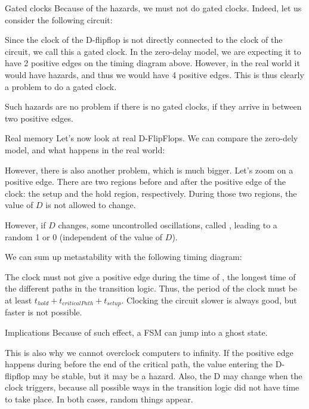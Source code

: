 \documentclass[a4paper]{article}
\begin{document}
\begin{parag}{Gated clocks}
    Because of the hazards, we must not do gated clocks. Indeed, let us consider the following circuit:

    Since the clock of the D-flipflop is not directly connected to the clock of the circuit, we call this a gated clock. In the zero-delay model, we are expecting it to have 2 positive edges on the timing diagram above. However, in the real world it would have hazards, and thus we would have 4 positive edges. This is thus clearly a problem to do a gated clock.

    Such hazards are no problem if there is no gated clocks, if they arrive in between two positive edges.
\end{parag}

\begin{parag}{Real memory}
    Let's now look at real D-FlipFlops. We can compare the zero-dely model, and what happens in the real world:

    However, there is also another problem, which is much bigger. Let's zoom on a positive edge. There are two regions before and after the positive edge of the clock: the setup and the hold region, respectively. During those two regions, the value of $D$ is not allowed to change.

    However, if $D$ changes, some uncontrolled oscillations, called , leading to a random 1 or 0 (independent of the value of $D$).

    We can sum up metastability with the following timing diagram:

    The clock must not give a positive edge during the time of , the longest time of the different paths in the transition logic. Thus, the period of the clock must be at least $t_{hold} + t_{criticalPath} + t_{setup}$. Clocking the circuit slower is always good, but faster is not possible.

    \begin{subparag}{Implications}
        Because of such effect, a FSM can jump into a ghost state.

        This is also why we cannot overclock computers to infinity. If the positive edge happens during before the end of the critical path, the value entering the D-flipflop may be stable, but it may be a hazard. Also, the D may change when the clock triggers, because all possible ways in the transition logic did not have time to take place. In both cases, random things appear.
    \end{subparag}
\end{parag}
\end{document}
